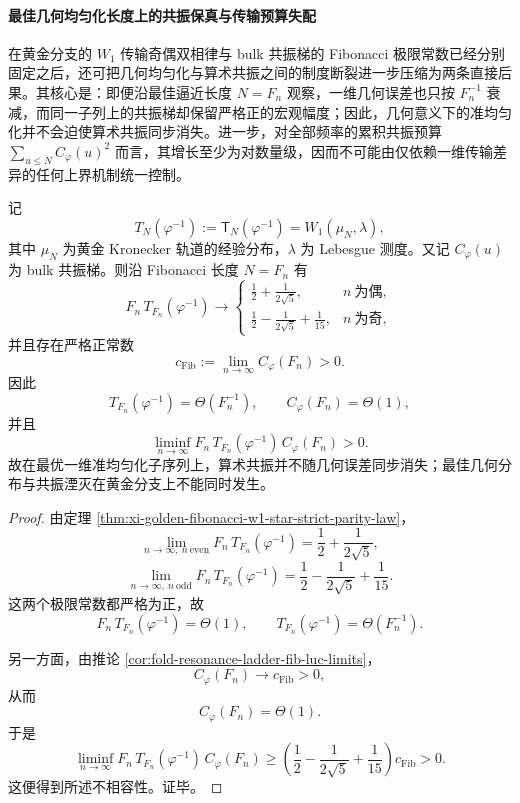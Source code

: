 \paragraph{最佳几何均匀化长度上的共振保真与传输预算失配}
在黄金分支的 \(W_1\) 传输奇偶双相律与 bulk 共振梯的 Fibonacci 极限常数已经分别固定之后，还可把几何均匀化与算术共振之间的制度断裂进一步压缩为两条直接后果。其核心是：即便沿最佳逼近长度 \(N=F_n\) 观察，一维几何误差也只按 \(F_n^{-1}\) 衰减，而同一子列上的共振梯却保留严格正的宏观幅度；因此，几何意义下的准均匀化并不会迫使算术共振同步消失。进一步，对全部频率的累积共振预算 \(\sum_{u\le N}C_\varphi(u)^2\) 而言，其增长至少为对数量级，因而不可能由仅依赖一维传输差异的任何上界机制统一控制。

\begin{theorem}[最佳逼近长度上的几何均匀化与算术共振不相容]\label{thm:xi-time-part9zi-fibonacci-transport-resonance-incompatibility}
记
\[
T_N(\varphi^{-1}):=\mathsf T_N(\varphi^{-1})
=
W_1(\mu_N,\lambda),
\]
其中 \(\mu_N\) 为黄金 Kronecker 轨道的经验分布，\(\lambda\) 为 Lebesgue 测度。又记 \(C_\varphi(u)\) 为 bulk 共振梯。则沿 Fibonacci 长度 \(N=F_n\) 有
\[
F_n\,T_{F_n}(\varphi^{-1})
\longrightarrow
\begin{cases}
\displaystyle \frac12+\frac{1}{2\sqrt5}, & n\ \text{为偶},\\[2mm]
\displaystyle \frac12-\frac{1}{2\sqrt5}+\frac1{15}, & n\ \text{为奇},
\end{cases}
\]
并且存在严格正常数
\[
c_{\mathrm{Fib}}:=\lim_{n\to\infty}C_\varphi(F_n)>0.
\]
因此
\[
T_{F_n}(\varphi^{-1})=\Theta(F_n^{-1}),
\qquad
C_\varphi(F_n)=\Theta(1),
\]
并且
\[
\liminf_{n\to\infty}
F_n\,T_{F_n}(\varphi^{-1})\,C_\varphi(F_n)>0.
\]
故在最优一维准均匀化子序列上，算术共振并不随几何误差同步消失；最佳几何分布与共振湮灭在黄金分支上不能同时发生。
\end{theorem}
\begin{proof}
由定理 \ref{thm:xi-golden-fibonacci-w1-star-strict-parity-law}，
\[
\lim_{n\to\infty,\ n\ \mathrm{even}}
F_n\,T_{F_n}(\varphi^{-1})
=
\frac12+\frac{1}{2\sqrt5},
\]
\[
\lim_{n\to\infty,\ n\ \mathrm{odd}}
F_n\,T_{F_n}(\varphi^{-1})
=
\frac12-\frac{1}{2\sqrt5}+\frac1{15}.
\]
这两个极限常数都严格为正，故
\[
F_n\,T_{F_n}(\varphi^{-1})=\Theta(1),
\qquad
T_{F_n}(\varphi^{-1})=\Theta(F_n^{-1}).
\]

另一方面，由推论 \ref{cor:fold-resonance-ladder-fib-luc-limits}，
\[
C_\varphi(F_n)\longrightarrow c_{\mathrm{Fib}}>0,
\]
从而
\[
C_\varphi(F_n)=\Theta(1).
\]
于是
\[
\liminf_{n\to\infty}
F_n\,T_{F_n}(\varphi^{-1})\,C_\varphi(F_n)
\ge
\left(\frac12-\frac{1}{2\sqrt5}+\frac1{15}\right)c_{\mathrm{Fib}}
>0.
\]
这便得到所述不相容性。证毕。
\end{proof}

